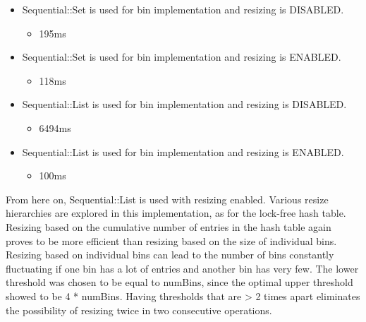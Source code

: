 \documentclass[11pt]{article} %
\begin{document}
\begin{itemize}
	\item Sequential::Set is used for bin implementation and resizing is DISABLED.
	\begin{itemize}
    		\item 195ms
	\end{itemize}
	\item Sequential::Set is used for bin implementation and resizing is ENABLED.
	\begin{itemize}
		\item 118ms
	\end{itemize}
	\item Sequential::List is used for bin implementation and resizing is DISABLED.
	\begin{itemize}
		\item 6494ms
	\end{itemize}
	\item Sequential::List is used for bin implementation and resizing is ENABLED.
	\begin{itemize}
		\item 100ms
	\end{itemize}
\end{itemize}

From here on, Sequential::List is used with resizing enabled. Various resize hierarchies are explored in this implementation, as for the lock-free hash table. Resizing based on the cumulative number of entries in the hash table again proves to be more efficient than resizing based on the size of individual bins. Resizing based on individual bins can lead to the number of bins constantly fluctuating if one bin has a lot of entries and another bin has very few. The lower threshold was chosen to be equal to numBins, since the optimal upper threshold showed to be 4 * numBins. Having thresholds that are > 2 times apart eliminates the possibility of resizing twice in two consecutive operations.
\end{document}
